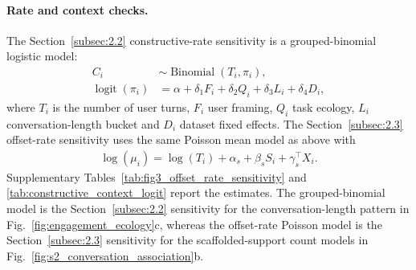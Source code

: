 \paragraph{Rate and context checks.}
The Section~\ref{subsec:2.2} constructive-rate sensitivity is a grouped-binomial logistic model:
\begin{align*}
C_i &\sim \operatorname{Binomial}(T_i,\pi_i),\\
\operatorname{logit}(\pi_i) &=
\alpha + \delta_1 F_i + \delta_2 Q_i + \delta_3 L_i + \delta_4 D_i ,
\end{align*}
where $T_i$ is the number of user turns, $F_i$ user framing, $Q_i$ task ecology, $L_i$ conversation-length bucket and $D_i$ dataset fixed effects. The Section~\ref{subsec:2.3} offset-rate sensitivity uses the same Poisson mean model as above with
\begin{align*}
\log(\mu_i) = \log(T_i) + \alpha_s + \beta_s S_i + \gamma_s^\top X_i .
\end{align*}
Supplementary Tables~\ref{tab:fig3_offset_rate_sensitivity} and \ref{tab:constructive_context_logit} report the estimates.
The grouped-binomial model is the Section~\ref{subsec:2.2} sensitivity for the conversation-length pattern in Fig.~\ref{fig:engagement_ecology}c, whereas the offset-rate Poisson model is the Section~\ref{subsec:2.3} sensitivity for the scaffolded-support count models in Fig.~\ref{fig:s2_conversation_association}b.


